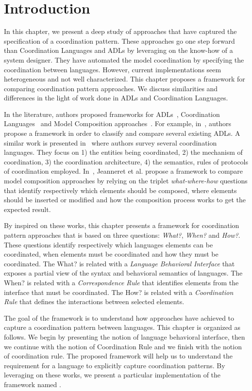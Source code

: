\section{Introduction}
In this chapter, we present a deep study of approaches that have captured the specification of a coordination pattern. These approaches go one step forward than Coordination Languages and ADLs by leveraging on the know-how of a system designer. They have automated the model coordination by specifying the coordination between languages. However, current implementations seem heterogeneous and not well characterized. This chapter proposes a framework for comparing coordination pattern approaches. We discuss similarities and differences in the light of work done in ADLs and Coordination Languages. 

In the literature, authors proposed frameworks for ADLs~\cite{frameadlsbib}, Coordination Languages~\cite{coordmodels} and Model Composition approaches~\cite{framecompoas}. For example, in~\cite{frameadlsbib}, authors propose a framework in order to classify and compare several existing ADLs. A similar work is presented in~\cite{coordmodels} where authors survey several coordination languages. They focus on 1) the entities being coordinated, 2) the mechanism of
coordination, 3) the coordination architecture, 4) the semantics, rules of protocols of coordination employed. In~\cite{framecompoas}, Jeanneret et al. propose a framework to compare model
composition approaches by relying on the triplet \emph{what-where-how} questions that identify respectively which elements should be composed, where elements should be inserted or modified and how the composition process works to get the expected result. 

By inspired on these works, this chapter presents a framework for coordination pattern approaches that is based on three questions: \emph{What?}, \emph{When?} and \emph{How?}. These questions identify respectively which languages elements can be coordinated, when elements must be coordinated and how they must be coordinated. The What? is related with a \emph{Language Behavioral Interface} that exposes a partial view of the syntax and behavioral semantics of languages. The When? is related with a \emph{Correspondence Rule} that identifies elements from the interface that must be coordinated. The How? is related with a \emph{Coordination Rule} that defines the interactions between selected elements. 

The goal of the framework is to understand how approaches have achieved to capture a coordination pattern between languages. This chapter is organized as follows. We begin by presenting the notion of language behavioral interface, then we continue with the notion of Coordination Rule and we finish with the notion of coordination rule. The proposed framework will help us to understand the requirement for a language to explicitly capture coordination patterns. By leveraging on these works, we present a particular implementation of the framework named \bcool.   

